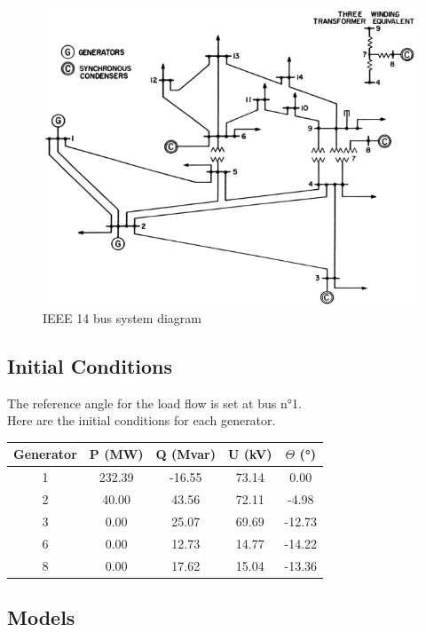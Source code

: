 \documentclass[a4paper, 12pt]{report}
\begin{document}
\begin{figure}[H]
  \includegraphics[width=\textwidth]{Single-line-diagram-of-IEEE-14-bus-system.png}
  \caption{IEEE 14 bus system diagram}
\end{figure}

\subsection{Initial Conditions}

The reference angle for the load flow is set at bus n°1. \\

Here are the initial conditions for each generator.

\begin{center}
\begin{tabular}{|c|c|c|c|c|}
  \hline
  Generator & P (MW) & Q (Mvar) & U (kV) & $\Theta$ (°) \\
  \hline
  1 & 232.39 & -16.55 & 73.14 & 0.00\\
  2 & 40.00 & 43.56 & 72.11 & -4.98\\
  3 & 0.00 & 25.07 & 69.69 & -12.73\\
  6 & 0.00 & 12.73 & 14.77 & -14.22\\
  8 & 0.00 & 17.62 & 15.04 & -13.36\\
  \hline
\end{tabular}
\end{center}

\subsection{Models}
\end{document}
